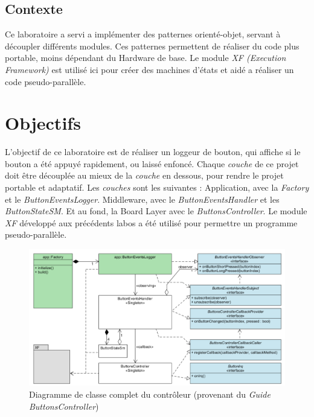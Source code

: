 \begin{summary}
\section{Contexte}
Ce laboratoire a servi a implémenter des patternes orienté-objet,
servant à découpler différents modules. Ces patternes permettent de
réaliser du code plus portable, moins dépendant du Hardware de base.
Le module \emph{XF (Execution Framework)} est utilisé ici pour créer des
machines d'états et aidé a réaliser un code pseudo-parallèle.
\end{summary} \newpage

\section{Objectifs}
L'objectif de ce laboratoire est de réaliser un loggeur de bouton, qui affiche si le bouton
a été appuyé rapidement, ou laissé enfoncé.
Chaque \emph{couche} de ce projet doit être découplée au mieux de la \emph{couche} en dessous,
pour rendre le projet portable et adaptatif. Les \emph{couches} sont les suivantes :
Application, avec la \emph{Factory} et le \emph{ButtonEventsLogger}. Middleware, avec
le \emph{ButtonEventsHandler} et les \emph{ButtonStateSM}. Et au fond, la Board Layer avec
le \emph{ButtonsController}.
Le module \emph{XF} développé aux précédents labos a été utilisé pour
permettre un programme pseudo-parallèle.
\begin{figure}[H]
    \centering
    \includegraphics[width=1\textwidth]{Images/buttons/full_uml.PNG}
    \caption[Full UML]{Diagramme de classe complet du contrôleur
    (provenant du \emph{Guide ButtonsController}\footnotemark)}
\end{figure}
